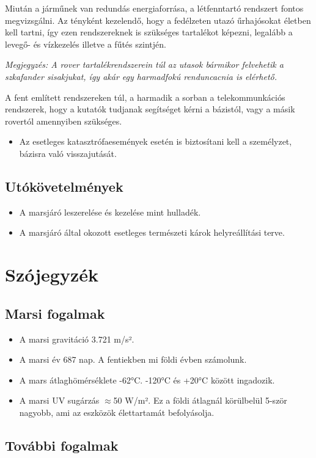 \documentclass[12pt]{report}
\begin{document}
Miután a járműnek van redundás energiaforrása, a létfenntartó rendszert fontos megvizsgálni. Az tényként kezelendő, hogy a fedélzeten utazó űrhajósokat életben kell tartni, így ezen rendszereknek is szükséges tartalékot képezni, legalább a levegő- és vízkezelés illetve a fűtés szintjén. 

\textit{Megjegyzés: A rover tartalékrendszerein túl az utasok bármikor felvehetik a szkafander sisakjukat, így akár egy harmadfokú renduncacnia is elérhető.}

A fent említett rendszereken túl, a harmadik a sorban a telekommunkációs rendszerek, hogy a kutatók tudjanak segítséget kérni a bázistól, vagy a másik rovertól amennyiben szükséges.

\begin{itemize}
  \item Az esetleges katasztrófaesemények esetén is biztosítani kell a személyzet, bázisra való visszajutását.
\end{itemize}
\section{Utókövetelmények}
\begin{itemize}
  \item {} A marsjáró leszerelése és kezelése mint hulladék.
  \item {} A marsjáró által okozott esetleges természeti károk helyreállítási terve.
\end{itemize}

\chapter{Szójegyzék}
\section{Marsi fogalmak}
\begin{itemize}
  \item A marsi gravitáció 3.721 m/s².
  \item A marsi év 687 nap. A fentiekben mi földi évben számolunk.
  \item A mars átlaghömérséklete -62°C. -120°C és +20°C között ingadozik.
  \item A marsi UV sugárzás $\approx$50 W/m². Ez a földi átlagnál körülbelül 5-ször nagyobb, ami az eszközök élettartamát befolyásolja.
\end{itemize}

\section{További fogalmak}
\end{document}
